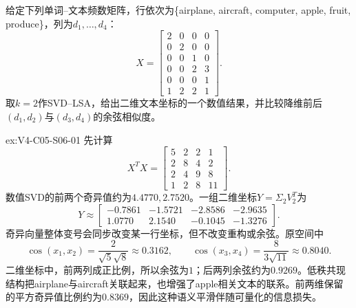\begin{SLChapterExercisePairSection}

\begin{exercise}\label{ex:V4-C05-S06-01}
给定下列单词--文本频数矩阵，行依次为\{airplane, aircraft, computer, apple, fruit, produce\}，列为$d_1,\ldots,d_4$：
\[
X=\begin{bmatrix}
2&0&0&0\\0&2&0&0\\0&0&1&0\\0&0&2&3\\0&0&0&1\\1&2&2&1
\end{bmatrix}.
\]
取$k=2$作SVD--LSA，给出二维文本坐标的一个数值结果，并比较降维前后$(d_1,d_2)$与$(d_3,d_4)$的余弦相似度。
\end{exercise}
\ifSLFullEdition
{}\label{sol:V4-C05-S06-01}
\begin{chapterexercisesolution}{ex:V4-C05-S06-01}
先计算
\[
X^TX=\begin{bmatrix}
5&2&2&1\\2&8&4&2\\2&4&9&8\\1&2&8&11
\end{bmatrix}.
\]
数值SVD的前两个奇异值约为$4.4770,2.7520$。一组二维坐标$Y=\Sigma_2V_2^T$为
\[
Y\approx\begin{bmatrix}
-0.7861&-1.5721&-2.8586&-2.9635\\
 1.0770& 2.1540&-0.1045&-1.3276
\end{bmatrix}.
\]
奇异向量整体变号会同步改变某一行坐标，但不改变重构或余弦。原空间中
\[
\cos(x_1,x_2)=\frac{2}{\sqrt5\sqrt8}\approx0.3162,
\qquad
\cos(x_3,x_4)=\frac8{3\sqrt{11}}\approx0.8040.
\]
二维坐标中，前两列成正比例，所以余弦为$1$；后两列余弦约为$0.9269$。低秩共现结构把airplane与aircraft关联起来，也增强了apple相关文本的联系。前两维保留的平方奇异值比例约为$0.8369$，因此这种语义平滑伴随可量化的信息损失。
\end{chapterexercisesolution}
\fi


\end{SLChapterExercisePairSection}
